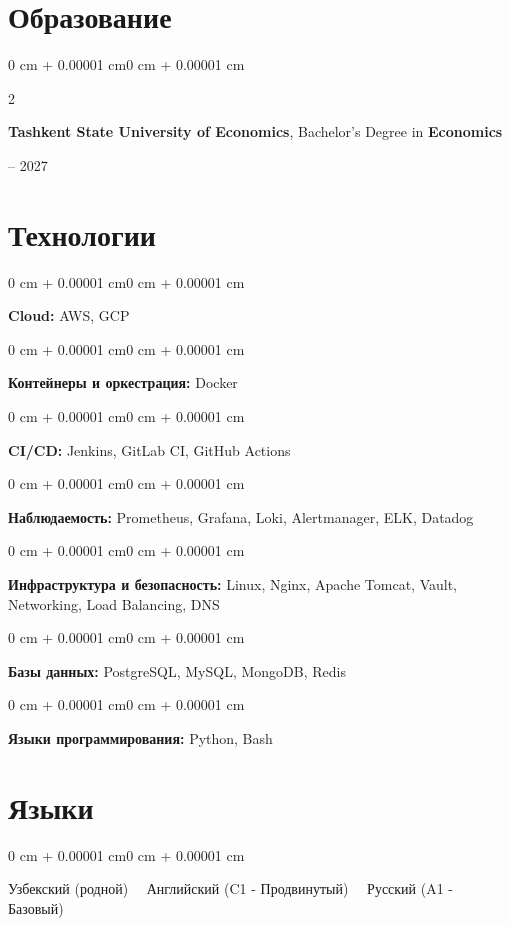 \documentclass[10pt, letterpaper]{article}
\newenvironment{onecolentry}{
    \begin{adjustwidth}{0 cm + 0.00001 cm}{0 cm + 0.00001 cm}
}{
    \end{adjustwidth}
}
\newenvironment{twocolentry}[2][]{
    \onecolentry
    \def\secondColumn{#2}
    \setcolumnwidth{\fill, 4.5 cm}
    \begin{paracol}{2}
}{
    \switchcolumn \raggedleft \secondColumn
    \end{paracol}
    \endonecolentry
}
\begin{document}
    \section{Образование}
    \begin{twocolentry}{2022 -- 2027}
        \textbf{Tashkent State University of Economics}, Bachelor's Degree in \textbf{Economics}
    \end{twocolentry}
    
\section{Технологии}

\begin{onecolentry}
\textbf{Cloud:} AWS, GCP
\end{onecolentry}

\vspace{0.2 cm}

\begin{onecolentry}
\textbf{Контейнеры и оркестрация:} Docker
\end{onecolentry}

\vspace{0.2 cm}

\begin{onecolentry}
\textbf{CI/CD:} Jenkins, GitLab CI, GitHub Actions
\end{onecolentry}

\vspace{0.2 cm}

\begin{onecolentry}
\textbf{Наблюдаемость:} Prometheus, Grafana, Loki, Alertmanager, ELK, Datadog
\end{onecolentry}

\vspace{0.2 cm}

\begin{onecolentry}
\textbf{Инфраструктура и безопасность:} Linux, Nginx, Apache Tomcat, Vault, Networking, Load Balancing, DNS
\end{onecolentry}

\vspace{0.2 cm}

\begin{onecolentry}
\textbf{Базы данных:} PostgreSQL, MySQL, MongoDB, Redis
\end{onecolentry}

\vspace{0.2 cm}

\begin{onecolentry}
\textbf{Языки программирования:} Python, Bash
\end{onecolentry}

    \section{Языки}
    \begin{onecolentry}
        Узбекский (родной) \ \AND\ Английский (C1 - Продвинутый) \ \AND\ Русский (A1 - Базовый)
    \end{onecolentry}
\end{document}

